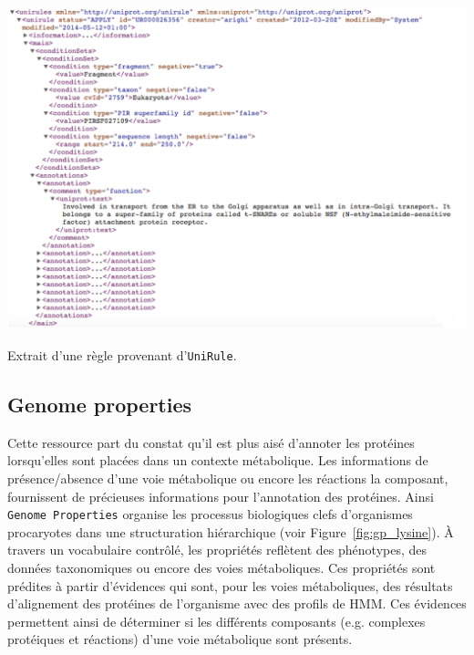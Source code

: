 \begin{refsegment}
    \begin{shadedfigure}[H]
        \centering
        \includegraphics[width=\textwidth]{img/regle_unirule.png}
        \caption{Extrait d'une règle provenant d'\texttt{UniRule}. }
        \label{fig:regle_unirule}
    \end{shadedfigure}
    
    
    
    \subsection{Genome properties}
    
    Cette ressource part du constat qu'il est plus aisé d'annoter les protéines lorsqu'elles sont placées dans un contexte métabolique. Les informations de présence/absence d'une voie métabolique ou encore les réactions la composant, fournissent de précieuses informations pour l'annotation des protéines. Ainsi \texttt{Genome Properties} \cite{selengut2007tigrfams,haft2005genome,haft2013tigrfams} organise les processus biologiques clefs d'organismes procaryotes dans une structuration hiérarchique (voir Figure~\cref{fig:gp_lysine}). À travers un vocabulaire contrôlé, les propriétés reflètent des phénotypes, des données taxonomiques ou encore des voies métaboliques.  Ces propriétés sont prédites à partir d'évidences qui sont, pour les voies métaboliques, des résultats d'alignement des protéines de l'organisme avec des profils de \gls{HMM}. Ces évidences permettent ainsi de déterminer si les différents composants (e.g. complexes protéiques et réactions) d'une voie métabolique sont présents. 
    

\end{refsegment}

